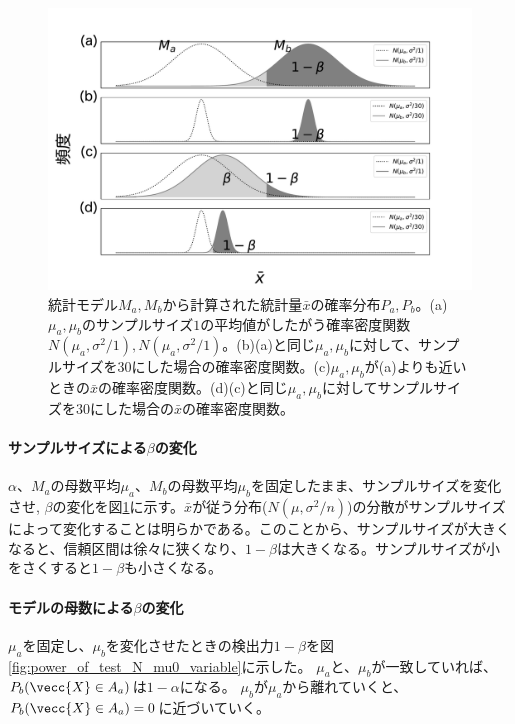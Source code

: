 \begin{figure}
    \begin{center}
        \includegraphics[width=15cm]{./image/04_/power_of_a_test_3.pdf}
        \caption{統計モデル$M_a,M_b$から計算された統計量$\bar{x}$の確率分布$P_a,P_b$。(a)$\mu_a,\mu_b$のサンプルサイズ$1$の平均値がしたがう確率密度関数$N(\mu_a,\sigma^2/1),N(\mu_a,\sigma^2/1)$。(b)(a)と同じ$\mu_a,\mu_b$に対して、サンプルサイズを$30$にした場合の確率密度関数。(c)$\mu_a,\mu_b$が(a)よりも近いときの$\bar{x}$の確率密度関数。(d)(c)と同じ$\mu_a,\mu_b$に対してサンプルサイズを$30$にした場合の$\bar{x}$の確率密度関数。}
        \label{fig:power_of_test_alpha_beta_sample_size}
    \end{center}
    \end{figure}

\paragraph{サンプルサイズによる$\beta$の変化}

$\alpha$、$M_a$の母数平均$\mu_a$、$M_b$の母数平均$\mu_b$を固定したまま、サンプルサイズを変化させ,
$\beta$の変化を図\ref{fig:power_of_test_alpha_beta_sample_size}に示す。$\bar{x}$が従う分布($N(\mu,\sigma^2/n)$)の分散がサンプルサイズによって変化することは明らかである。このことから、サンプルサイズが大きくなると、信頼区間は徐々に狭くなり、$1-\beta$は大きくなる。サンプルサイズが小をさくすると$1-\beta$も小さくなる。

\paragraph{モデルの母数による$\beta$の変化}
$\mu_a$を固定し、$\mu_b$を変化させたときの検出力$1-\beta$を図\ref{fig:power_of_test_N_mu0_variable}に示した。
$\mu_a$と、$\mu_b$が一致していれば、$P_b(\vecc{X} \in A_a )$は$1-\alpha$になる。
$\mu_b$が$\mu_a$から離れていくと、$P_b(\vecc{X} \in A_a)=0$に近づいていく。

